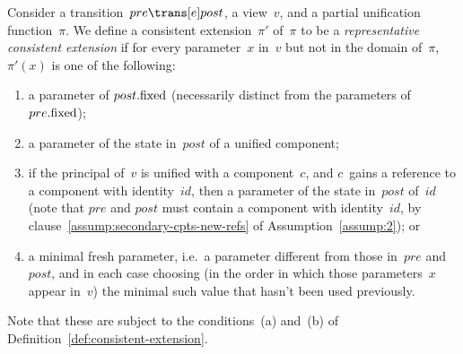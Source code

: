 \begin{definition}
\label{def:representative-consistent-extension}
Consider a transition~$pre \trans[e] post$, a view~$v$, and a
partial unification function~$\pi$.  We define a consistent extension~$\pi'$
of~$\pi$ to be a \emph{representative consistent extension} if for every
parameter~$x$ in~$v$ but not in the domain of~$\pi$,\, $\pi'(x)$ is one of the
following:
%
\begin{enumerate}
\item\label{clause:remap-1} a parameter of $post.\mathrm{fixed}$ (necessarily distinct
  from the parameters of $pre.\mathrm{fixed}$); 

\item\label{clause:remap-2} a parameter of the state in~$post$ of a unified
  component;

\item\label{clause:remap-3} if the principal of~$v$ is unified with a
  component~$c$, and $c$~gains a reference to a component with identity~$id$,
  then a parameter of the state in~$post$ of~$id$ (note that $pre$ and $post$
  must contain a component with identity~$id$, by
  clause~\ref{assump:secondary-cpts-new-refs} of Assumption~\ref{assump:2}); or

\item\label{clause:remap-4} a minimal fresh parameter, i.e.~a parameter
  different from those in~$pre$ and~$post$, and in each case choosing (in the
  order in which those parameters~$x$ appear in~$v$) the minimal such value
  that hasn't been used previously. 
\end{enumerate}
%
%
Note that these are subject to the conditions~(a) and~(b) of
Definition~\ref{def:consistent-extension}. 
\end{definition}
%


